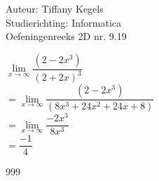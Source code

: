\documentclass[a4paper]{article}
\begin{document}
  
\noindent \large Auteur: Tiffany Kegels \\
\noindent \large Studierichting: Informatica\\
\noindent \large Oefeningenreeks 2D nr. 9.19\\

\medskip

\normalsize

$\lim\limits_{x \rightarrow \infty} \dfrac{(2-2x^3)}{(2+2x)^3}$\\

$ = \lim\limits_{x \rightarrow \infty} \dfrac{(2-2x^3)}{(8x^3 + 24x^2 + 24x + 8)}$\\

$ = \lim\limits_{x \rightarrow \infty} \dfrac{-2x^3}{8x^3}$\\

$ = \dfrac{-1}{4}$

\begin{thebibliography}{999}

\end{thebibliography}
\end{document}
